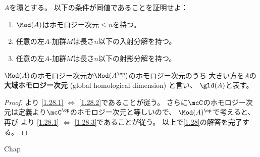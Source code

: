 \documentclass[uplatex,dvipdfmx]{jsarticle}
\begin{document}
\maketitle\HeaderCommentA
\section{}
\fi


\begin{prob}\label{1.28}
  \(A\)を環とする。
  以下の条件が同値であることを証明せよ：
  \begin{enumerate}
    \item \label{1.28.1}
    \(\Mod(A)\)はホモロジー次元\(\leq n\)を持つ。
    \item \label{1.28.2}
    任意の左\(A\)-加群\(M\)は長さ\(n\)以下の入射分解を持つ。
    \item \label{1.28.3}
    任意の左\(A\)-加群\(M\)は長さ\(n\)以下の射影分解を持つ。
  \end{enumerate}
  \(\Mod(A)\)のホモロジー次元か\(\Mod(A^{\op})\)のホモロジー次元のうち
  大きい方を\(A\)の\textbf{大域ホモロジー次元}
  (global homological dimension) と言い、
  \(\gld(A)\)と表す。
\end{prob}

\begin{proof}
  より
  \ref{1.28.1} \(\iff\) \ref{1.28.2}であることが従う。
  さらに\(\mcC\)のホモロジー次元は定義より\(\mcC^{\op}\)のホモロジー次元と等しいので、
  \(\Mod(A)^{\op}\)で考えると、再び
  より
  \ref{1.28.1} \(\iff\) \ref{1.28.3}であることが従う。
  以上で\autoref{1.28}の解答を完了する。
\end{proof}


\ifcsname Chap\endcsname\else
\printbibliography
\end{document}
